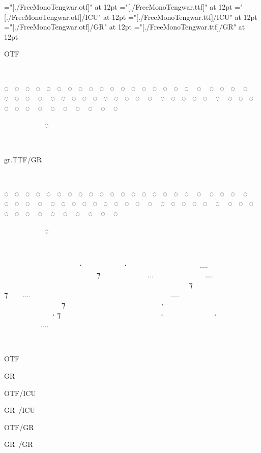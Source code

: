 

\font\opentype   ="[./FreeMonoTengwar.otf]" at 12pt
\font\graphite   ="[./FreeMonoTengwar.ttf]" at 12pt
\font\opentypeicu="[./FreeMonoTengwar.otf]/ICU" at 12pt
\font\graphiteicu="[./FreeMonoTengwar.ttf]/ICU" at 12pt
\font\opentypegr ="[./FreeMonoTengwar.otf]/GR" at 12pt
\font\graphitegr ="[./FreeMonoTengwar.ttf]/GR" at 12pt

\opentype OTF

                          

◌ ◌ ◌ ◌ ◌ ◌ ◌ ◌ ◌ ◌ ◌ ◌ ◌ ◌ ◌ ◌ ◌ ◌ ◌ ◌ ◌ ◌ ◌ ◌ ◌ ◌ ◌ ◌ ◌ ◌ ◌ ◌ ◌ ◌ ◌ ◌ ◌ ◌ ◌ ◌ ◌ ◌ ◌ ◌ ◌ ◌ ◌ ◌ ◌ ◌ ◌ ◌ ◌ ◌ ◌ ◌

      ◌‍ ‍ ‍ ‍

~

\graphitegr gr.TTF/GR

                          

◌ ◌ ◌ ◌ ◌ ◌ ◌ ◌ ◌ ◌ ◌ ◌ ◌ ◌ ◌ ◌ ◌ ◌ ◌ ◌ ◌ ◌ ◌ ◌ ◌ ◌ ◌ ◌ ◌ ◌ ◌ ◌ ◌ ◌ ◌ ◌ ◌ ◌ ◌ ◌ ◌ ◌ ◌ ◌ ◌ ◌ ◌ ◌ ◌ ◌ ◌ ◌ ◌ ◌ ◌ ◌

      ◌‍ ‍ ‍ ‍

~

  ‍‍   ⸱‍  ‍ ⸱ \hfil\break
    ‍....  ‍  \hfil\break
  ‍   ‍ ‍ ⁊ ‍  \hfil\break
 ...    ....    \hfil\break
         ‍ \hfil\break
 ‍ ‍‍   ⁊  ‍ ‍ \hfil\break
 ‍ ⁊  ....  ‍ ‍‍   \hfil\break
   ‍ ..... ‍ ‍   \hfil\break
      ⁊    \hfil\break
   ‍⸱‍   ‍  \hfil\break
     ‍⸱ ⁊  ‍ \hfil\break
    ⸱    \hfil\break
⸱  ‍  .... ‍‍    \hfil\break

~

\opentype
OTF~~~~  ‍

\graphite
GR~~~~~  ‍

\opentypeicu
OTF/ICU  ‍

\graphiteicu
GR~/ICU  ‍

\opentypegr
OTF/GR~  ‍

\graphitegr
GR~/GR~  ‍


\bye

